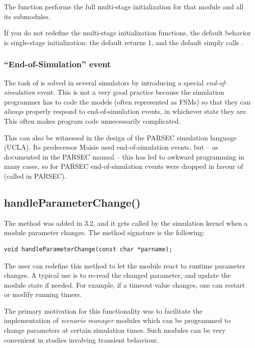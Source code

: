 The  function performs the full multi-stage initialization
for that module and all its submodules.

If you do not redefine the multi-stage initialization functions, the
default behavior is single-stage initialization: the default
 returns 1, and the default 
simply calls .


\subsubsection{``End-of-Simulation'' event}


The task of  is solved in several simulators
by introducing a special \textit{end-of-simulation} event.
This is not a very good practice because the simulation programmer has to
code the models (often represented as FSMs) so that they can \textit{always}
properly respond to end-of-simulation events, in whichever state they are. This
often makes program code unnecessarily complicated.

This can also be witnessed in the design of the PARSEC
simulation language (UCLA). Its predecessor Maisie used
end-of-simulation events, but -- as documented in the PARSEC manual --
this has led to awkward programming in many cases, so for PARSEC
end-of-simulation events were dropped in favour of 
(called  in PARSEC).


\subsection{handleParameterChange()}
\label{sec:simple-modules:handleParameterChange}

The  method was added in {\opp} 3.2,
and it gets called by the simulation kernel when a module parameter changes.
The method signature is the following:

\begin{verbatim}
void handleParameterChange(const char *parname);
\end{verbatim}

The user can redefine this method to let the module react to runtime parameter
changes. A typical use is to re-read the changed parameter, and update
the module state if needed. For example, if a timeout value changes,
one can restart or modify running timers.

The primary motivation for this functionality was to facilitate
the implementation of \textit{scenario manager} modules which
can be programmed to change parameters at certain simulation times.
Such modules can be very convenient in studies involving transient behaviour.

